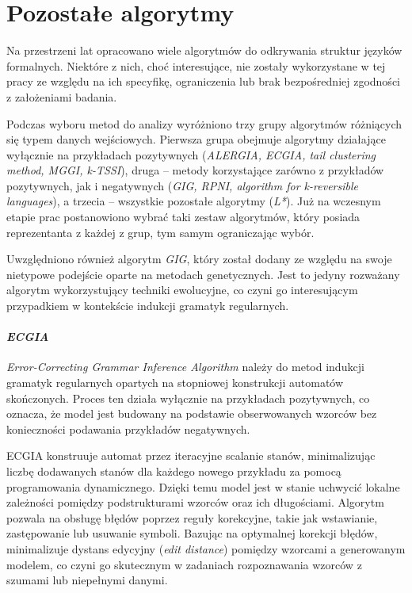\section{Pozostałe algorytmy}  
Na przestrzeni lat opracowano wiele algorytmów do odkrywania struktur języków formalnych. Niektóre z nich, choć interesujące, nie zostały wykorzystane w tej pracy ze względu na ich specyfikę, ograniczenia lub brak bezpośredniej zgodności z założeniami badania.  

Podczas wyboru metod do analizy wyróżniono trzy grupy algorytmów różniących się typem danych wejściowych. Pierwsza grupa obejmuje algorytmy działające wyłącznie na przykładach pozytywnych (\textit{ALERGIA, ECGIA, tail clustering method, MGGI, k-TSSI}), druga – metody korzystające zarówno z przykładów pozytywnych, jak i negatywnych (\textit{GIG, RPNI, algorithm for k-reversible languages}), a trzecia – wszystkie pozostałe algorytmy (\textit{L*}). Już na wczesnym etapie prac postanowiono wybrać taki zestaw algorytmów, który posiada reprezentanta z każdej z grup, tym samym ograniczając wybór.

Uwzględniono również algorytm \textit{GIG}, który został dodany ze względu na swoje nietypowe podejście oparte na metodach genetycznych. Jest to jedyny rozważany algorytm wykorzystujący techniki ewolucyjne, co czyni go interesującym przypadkiem w kontekście indukcji gramatyk regularnych.  


\paragraph*{\textit{ECGIA}}  
\textit{Error-Correcting Grammar Inference Algorithm} \cite{ECGI} należy do metod indukcji gramatyk regularnych opartych na stopniowej konstrukcji automatów skończonych. Proces ten działa wyłącznie na przykładach pozytywnych, co oznacza, że model jest budowany na podstawie obserwowanych wzorców bez konieczności podawania przykładów negatywnych.  

ECGIA konstruuje automat przez iteracyjne scalanie stanów, minimalizując liczbę dodawanych stanów dla każdego nowego przykładu za pomocą programowania dynamicznego. Dzięki temu model jest w stanie uchwycić lokalne zależności pomiędzy podstrukturami wzorców oraz ich długościami. Algorytm pozwala na obsługę błędów poprzez reguły korekcyjne, takie jak wstawianie, zastępowanie lub usuwanie symboli. Bazując na optymalnej korekcji błędów, minimalizuje dystans edycyjny (\textit{edit distance}) pomiędzy wzorcami a generowanym modelem, co czyni go skutecznym w zadaniach rozpoznawania wzorców z szumami lub niepełnymi danymi.  


